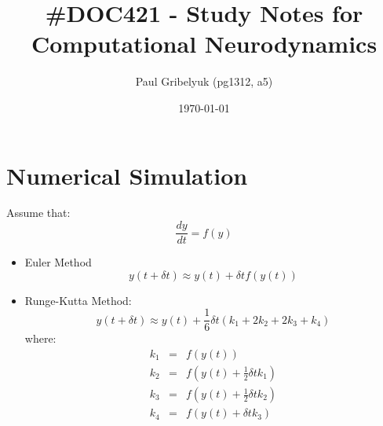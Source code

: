 \documentclass[a4paper,10pt]{article}
\author{Paul Gribelyuk (pg1312, a5)}
\title{\Large \#DOC421 - Study Notes for Computational Neurodynamics}
\date{\today}
\begin{document}
\maketitle
\section{Numerical Simulation}
Assume that:
$$
\frac{dy}{dt} = f(y)
$$
\begin{itemize}
  \item Euler Method
  $$
  y(t + \delta t) \approx y(t) + \delta t f(y(t))
  $$
  \item Runge-Kutta Method:
  $$
  y(t + \delta t) \approx y(t) + \frac{1}{6}\delta t ( k_1 + 2k_2 + 2k_3 + k_4)
  $$
  where:
  \begin{eqnarray*}
  k_1 &=& f(y(t)) \\
  k_2 &=& f(y(t) + \frac{1}{2}\delta t k_1) \\
  k_3 &=& f(y(t) + \frac{1}{2}\delta t k_2) \\
  k_4 &=& f(y(t) + \delta t k_3)
  \end{eqnarray*}
\end{itemize}
\end{document}
